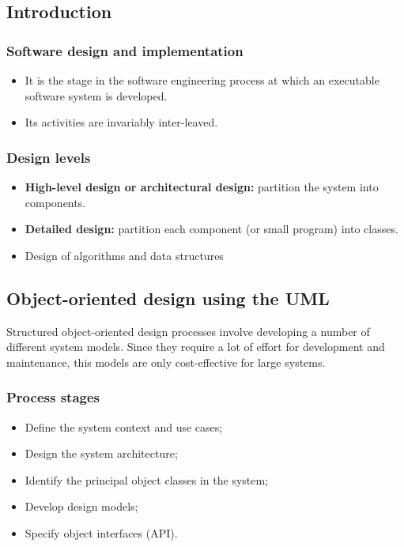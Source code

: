 \documentclass[../ESOF_notes.tex]{subfiles}
\begin{document}
\subsection{Introduction}
\subsubsection{Software design and implementation}
\begin{itemize}
    \item It is the stage in the software engineering process at which an executable software system is developed.
    \item Its activities are invariably inter-leaved.
\end{itemize}
\subsubsection{Design levels}
\begin{itemize}
    \item \textbf{High-level design or architectural design:} partition the system into components.
    \item \textbf{Detailed design:} partition each component (or small program) into classes.
    \item Design of algorithms and data structures
\end{itemize}
\subsection{Object-oriented design using the UML}
Structured object-oriented design processes involve developing a number of different system models.
\newline
Since they require a lot of effort for development and maintenance, this models are only cost-effective for large systems.
\newline
\subsubsection{Process stages}
\begin{itemize}
    \item Define the system context and use cases;
    \item Design the system architecture;
    \item Identify the principal object classes in the system;
    \item Develop design models;
    \item Specify object interfaces (API).
\end{itemize}
\end{document}
